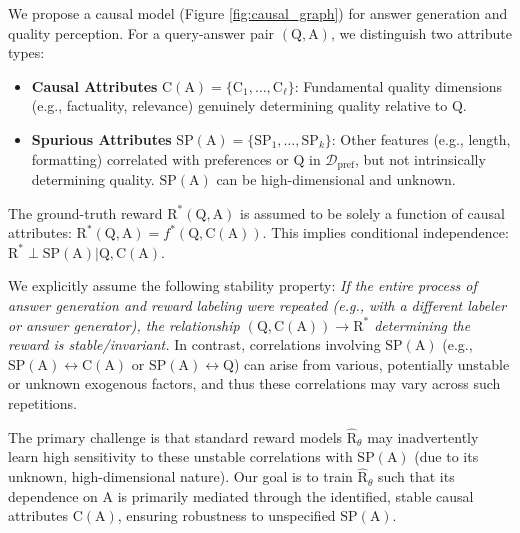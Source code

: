 \vspace{-0.05in}
We propose a causal model (Figure \ref{fig:causal_graph}) for answer generation and quality perception. For a query-answer pair $(\mathrm{Q}, \mathrm{A})$, we distinguish two attribute types:

\vspace{-0.1in}
\begin{itemize}[itemsep=0pt,left=0pt]
    \item \textbf{Causal Attributes} $\mathrm{C}(\mathrm{A}) = \{\mathrm{C}_1, \dots, \mathrm{C}_\ell\}$: Fundamental quality dimensions (e.g., factuality, relevance) genuinely determining quality relative to $\mathrm{Q}$.
    \item \textbf{Spurious Attributes} $\mathrm{SP}(\mathrm{A}) = \{\mathrm{SP}_1, \dots, \mathrm{SP}_k\}$: Other features (e.g., length, formatting) correlated with preferences or $\mathrm{Q}$ in $\mathcal{D}_{\mathrm{pref}}$, but not intrinsically determining quality. $\mathrm{SP}(\mathrm{A})$ can be high-dimensional and unknown.
\end{itemize}

\vspace{-0.1in}
The ground-truth reward $\mathrm{R}^*(\mathrm{Q}, \mathrm{A})$ is assumed to be solely a function of causal attributes: $\mathrm{R}^*(\mathrm{Q}, \mathrm{A}) = f^*(\mathrm{Q}, \mathrm{C}(\mathrm{A}))$. This implies conditional independence: $\mathrm{R}^* \perp \mathrm{SP}(\mathrm{A}) | \mathrm{Q}, \mathrm{C}(\mathrm{A})$.

We explicitly assume the following stability property: \textit{If the entire process of answer generation and reward labeling were repeated (e.g., with a different labeler or answer generator), the relationship $(\mathrm{Q}, \mathrm{C}(\mathrm{A})) \to \mathrm{R}^{*}$ determining the reward is stable/invariant.} In contrast, correlations involving $\mathrm{SP}(\mathrm{A})$ (e.g., $\mathrm{SP}(\mathrm{A}) \leftrightarrow \mathrm{C}(\mathrm{A})$ or $\mathrm{SP}(\mathrm{A}) \leftrightarrow \mathrm{Q}$) can arise from various, potentially unstable or unknown exogenous factors, and thus these correlations may vary across such repetitions.

The primary challenge is that standard reward models $\hat{\mathrm{R}}_\theta$ may inadvertently learn high sensitivity to these unstable correlations with $\mathrm{SP}(\mathrm{A})$ (due to its unknown, high-dimensional nature). Our goal is to train $\hat{\mathrm{R}}_\theta$ such that its dependence on $\mathrm{A}$ is primarily mediated through the identified, stable causal attributes $\mathrm{C}(\mathrm{A})$, ensuring robustness to unspecified $\mathrm{SP}(\mathrm{A})$.







